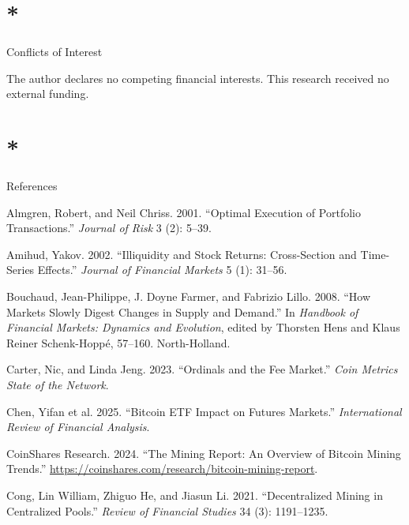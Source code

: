 \documentclass[
  11pt,
]{article}
\newlength{\cslhangindent}
\newlength{\cslentryspacingunit} %
\newenvironment{CSLReferences}[2] %
 {%
  \setlength{\parindent}{0pt}
  \ifodd #1
  \let\oldpar\par
  \def\par{\hangindent=\cslhangindent\oldpar}
  \fi
  \setlength{\parskip}{#2\cslentryspacingunit}
 }%
 {}
\let\oldsection\section
\renewcommand{\section}[1]{\FloatBarrier\oldsection{#1}}
\begin{document}
\hypertarget{conflicts-of-interest}{%
\section*{Conflicts of Interest}\label{conflicts-of-interest}}

The author declares no competing financial interests. This research
received no external funding.

\hypertarget{references}{%
\section*{References}\label{references}}

\hypertarget{refs}{}
\begin{CSLReferences}{1}{0}
\leavevmode{}%
Almgren, Robert, and Neil Chriss. 2001. {``Optimal Execution of
Portfolio Transactions.''} \emph{Journal of Risk} 3 (2): 5--39.

\leavevmode{}%
Amihud, Yakov. 2002. {``Illiquidity and Stock Returns: Cross-Section and
Time-Series Effects.''} \emph{Journal of Financial Markets} 5 (1):
31--56.

\leavevmode{}%
Bouchaud, Jean-Philippe, J. Doyne Farmer, and Fabrizio Lillo. 2008.
{``How Markets Slowly Digest Changes in Supply and Demand.''} In
\emph{Handbook of Financial Markets: Dynamics and Evolution}, edited by
Thorsten Hens and Klaus Reiner Schenk-Hoppé, 57--160. North-Holland.

\leavevmode{}%
Carter, Nic, and Linda Jeng. 2023. {``Ordinals and the Fee Market.''}
\emph{Coin Metrics State of the Network}.

\leavevmode{}%
Chen, Yifan et al. 2025. {``Bitcoin {ETF} Impact on Futures Markets.''}
\emph{International Review of Financial Analysis}.

\leavevmode{}%
CoinShares Research. 2024. {``The Mining Report: An Overview of Bitcoin
Mining Trends.''}
\url{https://coinshares.com/research/bitcoin-mining-report}.

\leavevmode{}%
Cong, Lin William, Zhiguo He, and Jiasun Li. 2021. {``Decentralized
Mining in Centralized Pools.''} \emph{Review of Financial Studies} 34
(3): 1191--1235.


\end{CSLReferences}
\end{document}
